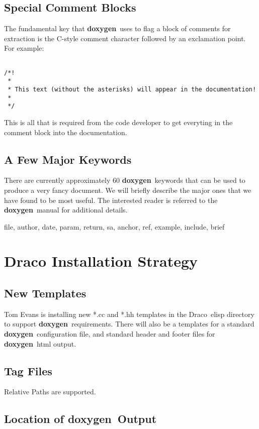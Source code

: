 \documentclass[11pt]{nmemo}
\newcommand{\draco}{{\normalfont\sffamily Draco}}
\newcommand{\doxy}{{\normalfont\bfseries doxygen}}
\begin{document}
\subsection{Special Comment Blocks}

The fundamental key that \doxy\ uses to flag a block of comments for
extraction is the C-style comment character followed by an exclamation
point. For example:\begin{verbatim}

/*!
 *
 * This text (without the asterisks) will appear in the documentation!
 *
 */

\end{verbatim}

This is all that is required from the code developer to get everyting
in the comment block into the documentation.

\subsection{A Few Major Keywords}

There are currently approximately 60 \doxy\ keywords that can be used to produce a
very fancy document. We will briefly describe the major ones that we have
found to be most useful. The interested reader is referred to the \doxy\
manual for additional details.

file, author, date, param, return, sa, anchor, ref, example, include, brief



\section{Draco Installation Strategy}
  \subsection{New Templates}
  Tom Evans is installing new *.cc and *.hh templates in the \draco\ elisp
directory to support \doxy\ requirements. There will also be a
templates for a standard \doxy\ configuration file, and standard header
and footer files for \doxy\ html output.
  \subsection{Tag Files}
Relative Paths are supported.

  \subsection{Location of \doxy\ Output}
\end{document}
